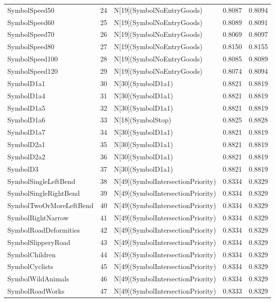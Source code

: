 \begin{tabular}{lllll}
SymbolSpeed50 & 24 & N[19](SymbolNoEntryGoods) & 0.8087 & 0.8094 \\
SymbolSpeed60 & 25 & N[19](SymbolNoEntryGoods) & 0.8089 & 0.8091 \\
SymbolSpeed70 & 26 & N[19](SymbolNoEntryGoods) & 0.8069 & 0.8097 \\
SymbolSpeed80 & 27 & N[19](SymbolNoEntryGoods) & 0.8150 & 0.8155 \\
SymbolSpeed100 & 28 & N[19](SymbolNoEntryGoods) & 0.8085 & 0.8089 \\
SymbolSpeed120 & 29 & N[19](SymbolNoEntryGoods) & 0.8074 & 0.8094 \\
SymbolD1a1 & 30 & N[30](SymbolD1a1) & 0.8821 & 0.8819 \\
SymbolD1a4 & 31 & N[30](SymbolD1a1) & 0.8821 & 0.8819 \\
SymbolD1a5 & 32 & N[30](SymbolD1a1) & 0.8821 & 0.8819 \\
SymbolD1a6 & 33 & N[18](SymbolStop) & 0.8825 & 0.8828 \\
SymbolD1a7 & 34 & N[30](SymbolD1a1) & 0.8821 & 0.8819 \\
SymbolD2a1 & 35 & N[30](SymbolD1a1) & 0.8821 & 0.8819 \\
SymbolD2a2 & 36 & N[30](SymbolD1a1) & 0.8821 & 0.8819 \\
SymbolD3 & 37 & N[30](SymbolD1a1) & 0.8821 & 0.8819 \\
SymbolSingleLeftBend & 38 & N[49](SymbolIntersectionPriority) & 0.8334 & 0.8329 \\
SymbolSingleRightBend & 39 & N[49](SymbolIntersectionPriority) & 0.8334 & 0.8329 \\
SymbolTwoOrMoreLeftBend & 40 & N[49](SymbolIntersectionPriority) & 0.8334 & 0.8329 \\
SymbolRightNarrow & 41 & N[49](SymbolIntersectionPriority) & 0.8334 & 0.8329 \\
SymbolRoadDeformities & 42 & N[49](SymbolIntersectionPriority) & 0.8334 & 0.8329 \\
SymbolSlipperyRoad & 43 & N[49](SymbolIntersectionPriority) & 0.8334 & 0.8329 \\
SymbolChildren & 44 & N[49](SymbolIntersectionPriority) & 0.8334 & 0.8329 \\
SymbolCyclists & 45 & N[49](SymbolIntersectionPriority) & 0.8334 & 0.8329 \\
SymbolWildAnimals & 46 & N[49](SymbolIntersectionPriority) & 0.8334 & 0.8329 \\
SymbolRoadWorks & 47 & N[49](SymbolIntersectionPriority) & 0.8333 & 0.8329 \\

\end{tabular}
